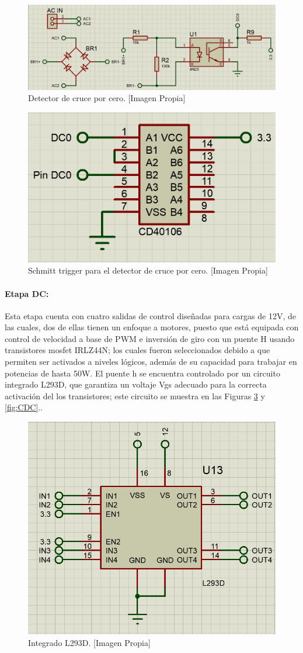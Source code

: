 		\begin{figure}[H]
			\centering
			\caption[Detector de cruce por cero.]{Detector de cruce por cero.  [Imagen Propia]}
			\label{fig:DC01}
			\includegraphics[width=0.85\linewidth]{Imagenes/DC01}
		\end{figure}
	
		\begin{figure}[H]
			\centering
			\caption[Schmitt trigger para el detector de cruce por cero.]{Schmitt trigger para el detector de cruce por cero. [Imagen Propia]}
			\label{fig:DC02}
			\includegraphics[width=0.5\linewidth]{Imagenes/DC02}
		\end{figure}
	
	\paragraph{Etapa DC:}
		Esta etapa cuenta con cuatro salidas de control diseñadas para cargas de 12V, de las cuales, dos de ellas tienen un enfoque a motores, puesto que está equipada con control de velocidad a base de PWM e inversión de giro con un puente H usando transistores mosfet IRLZ44N; los cuales fueron seleccionados debido a que permiten ser activados a niveles lógicos, además de su capacidad para trabajar en potencias de hasta 50W. El puente h se encuentra controlado por un circuito integrado L293D, que garantiza un voltaje Vgs adecuado para la correcta activación del los transistores; este circuito se muestra en las Figuras \ref{fig:L293D} y \ref{fig:CDC}.\cite{IRL}.\\

		\begin{figure}[H]
			\centering
			\caption[Integrado L293D.]{Integrado L293D. [Imagen Propia]}
			\label{fig:L293D}
			\includegraphics[width=0.5\linewidth]{Imagenes/L293D}
		\end{figure}

